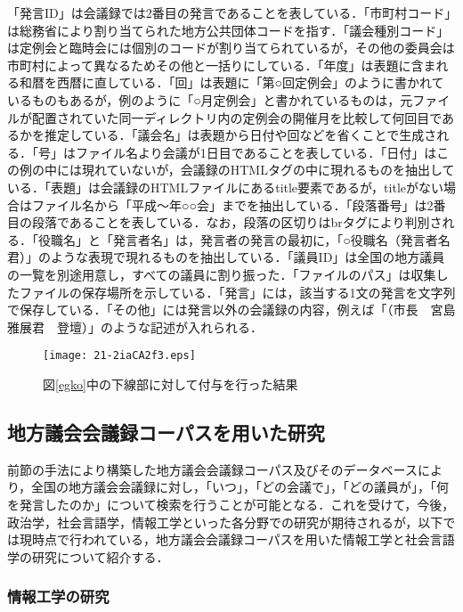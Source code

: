\documentclass[japanese]{jnlp_1.4}
\begin{document}
「発言ID」は会議録では2番目の発言であることを表している．「市町村コード」は総務省により割り当てられた地方公共団体コードを指す．「議会種別コード」は定例会と臨時会には個別のコードが割り当てられているが，その他の委員会は市町村によって異なるためその他と一括りにしている．「年度」は表題に含まれる和暦を西暦に直している．「回」は表題に「第○回定例会」のように書かれているものもあるが，例のように「○月定例会」と書かれているものは，元ファイルが配置されていた同一ディレクトリ内の定例会の開催月を比較して何回目であるかを推定している．「議会名」は表題から日付や回などを省くことで生成される．「号」はファイル名より会議が1日目であることを表している．「日付」はこの例の中には現れていないが，会議録のHTMLタグの中に現れるものを抽出している．「表題」は会議録のHTMLファイルにあるtitle要素であるが，titleがない場合はファイル名から「平成〜年○○会」までを抽出している．「段落番号」は2番目の段落であることを表している．なお，段落の区切りはbrタグにより判別される．「役職名」と「発言者名」は，発言者の発言の最初に，「○役職名（発言者名　君）」のような表現で現れるものを抽出している．「議員ID」は全国の地方議員の一覧を別途用意し，すべての議員に割り振った．「ファイルのパス」は収集したファイルの保存場所を示している．「発言」には，該当する1文の発言を文字列で保存している．「その他」には発言以外の会議録の内容，例えば「（市長　宮島雅展君　登壇）」のような記述が入れられる．

\begin{figure}[t]
 \begin{center}
 \texttt{[image: 21-2iaCA2f3.eps]}
 \end{center}
\caption{図\ref{egko}中の下線部に対して付与を行った結果}
\label{fig:huyoo}
\end{figure}


\subsection{地方議会会議録コーパスを用いた研究}

前節の手法により構築した地方議会会議録コーパス及びそのデータベースにより，全国の地方議会会議録に対し，「いつ」，「どの会議で」，「どの議員が」，「何を発言したのか」について検索を行うことが可能となる．これを受けて，今後，政治学，社会言語学，情報工学といった各分野での研究が期待されるが，以下では現時点で行われている，地方議会会議録コーパスを用いた情報工学と社会言語学の研究について紹介する．


\subsubsection{情報工学の研究}
\end{document}
